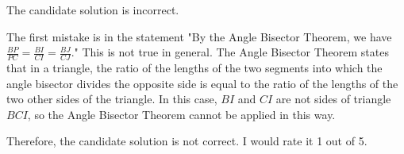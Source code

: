 The candidate solution is incorrect.

The first mistake is in the statement "By the Angle Bisector Theorem, we have $\frac{BP}{PC} = \frac{BI}{CI} = \frac{BJ}{CJ}$." This is not true in general. The Angle Bisector Theorem states that in a triangle, the ratio of the lengths of the two segments into which the angle bisector divides the opposite side is equal to the ratio of the lengths of the two other sides of the triangle. In this case, $BI$ and $CI$ are not sides of triangle $BCI$, so the Angle Bisector Theorem cannot be applied in this way.

Therefore, the candidate solution is not correct. I would rate it 1 out of 5.
